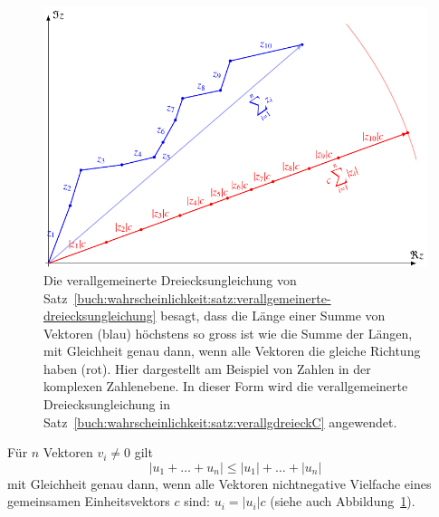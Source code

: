 \begin{figure}
\centering
\includegraphics{chapters/80-wahrscheinlichkeit/images/dreieck.pdf}
\caption{Die verallgemeinerte Dreiecksungleichung von
Satz~\ref{buch:wahrscheinlichkeit:satz:verallgemeinerte-dreiecksungleichung}
besagt, dass
die Länge einer Summe von Vektoren (blau) höchstens so gross ist wie die
Summe der Längen, mit Gleichheit genau dann, wenn alle Vektoren die
gleiche Richtung haben (rot).
Hier dargestellt am Beispiel von Zahlen in der komplexen Zahlenebene.
In dieser Form wird die verallgemeinerte Dreiecksungleichung in
Satz~\ref{buch:wahrscheinlichkeit:satz:verallgdreieckC}
angewendet.
\label{buch:wahrscheinlichkeit:fig:dreieck}}
\end{figure}

\begin{satz}
\label{buch:wahrscheinlichkeit:satz:verallgemeinerte-dreiecksungleichung}
Für $n$ Vektoren $v_i\ne 0$ gilt
\[
|u_1+\dots+u_n| \le |u_1|+\dots+|u_n|
\]
mit Gleichheit genau dann, wenn alle Vektoren nichtnegative Vielfache
eines gemeinsamen Einheitsvektors $c$ sind: $u_i=|u_i|c$
(siehe auch Abbildung~\ref{buch:wahrscheinlichkeit:fig:dreieck}).
\end{satz}

